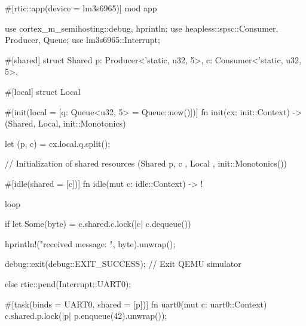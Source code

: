 #[rtic::app(device = lm3s6965)]
mod app {
    use cortex_m_semihosting::{debug, hprintln};
    use heapless::spsc::{Consumer, Producer, Queue};
    use lm3s6965::Interrupt;

    #[shared]
    struct Shared {
        p: Producer<'static, u32, 5>,
        c: Consumer<'static, u32, 5>,
    }

    #[local]
    struct Local {}

    #[init(local = [q: Queue<u32, 5> = Queue::new()])]
    fn init(cx: init::Context) -> (Shared, Local, init::Monotonics) {
        let (p, c) = cx.local.q.split();

        // Initialization of shared resources
        (Shared { p, c }, Local {}, init::Monotonics())
    }

    #[idle(shared = [c])]
    fn idle(mut c: idle::Context) -> ! {
        loop {
            if let Some(byte) = c.shared.c.lock(|c| c.dequeue()) {
                hprintln!("received message: {}", byte).unwrap();

                debug::exit(debug::EXIT_SUCCESS); // Exit QEMU simulator
            } else {
                rtic::pend(Interrupt::UART0);
            }
        }
    }

    #[task(binds = UART0, shared = [p])]
    fn uart0(mut c: uart0::Context) {
        c.shared.p.lock(|p| p.enqueue(42).unwrap());
    }
}
